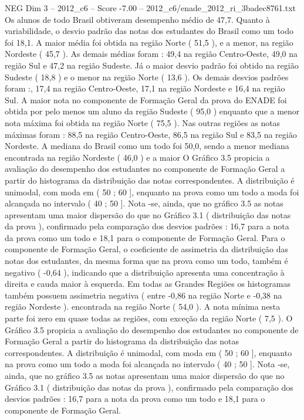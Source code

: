 \begin{textsample}{NEG Dim 3 – 2012\_c6 – Score -7.00 – 2012\_c6/enade\_2012\_ri\_3badec8761.txt}
Os alunos de todo Brasil obtiveram desempenho médio de 47,7.
Quanto à variabilidade, o desvio padrão das notas dos estudantes do Brasil como um todo foi 18,1.
A maior média foi obtida na região Norte ( 51,5 ), e a menor, na região Nordeste ( 45,7 ).
As demais médias foram : 49,4 na região Centro-Oeste, 49,0 na região Sul e 47,2 na região Sudeste.
Já o maior desvio padrão foi obtido na região Sudeste ( 18,8 ) e o menor na região Norte ( 13,6 ).
Os demais desvios padrões foram :, 17,4 na região Centro-Oeste, 17,1 na região Nordeste e 16,4 na região Sul.
A maior nota no componente de Formação Geral da prova do ENADE foi obtida por pelo menos um aluno da região Sudeste ( 95,0 ) enquanto que a menor nota máxima foi obtida na região Norte ( 75,5 ).
Nas outras regiões as notas máximas foram : 88,5 na região Centro-Oeste, 86,5 na região Sul e 83,5 na região Nordeste.
A mediana do Brasil como um todo foi 50,0, sendo a menor mediana encontrada na região Nordeste ( 46,0 ) e a maior O Gráfico 3.5 propicia a avaliação do desempenho dos estudantes no componente de Formação Geral a partir do histograma da distribuição das notas correspondentes.
A distribuição é unimodal, com moda em ( 50 ; 60 ], enquanto na prova como um todo a moda foi alcançada no intervalo ( 40 ; 50 ].
Nota -se, ainda, que no gráfico 3.5 as notas apresentam uma maior dispersão do que no Gráfico 3.1 ( distribuição das notas da prova ), confirmado pela comparação dos desvios padrões : 16,7 para a nota da prova como um todo e 18,1 para o componente de Formação Geral.
Para o componente de Formação Geral, o coeficiente de assimetria da distribuição das notas dos estudantes, da mesma forma que na prova como um todo, também é negativo ( -0,64 ), indicando que a distribuição apresenta uma concentração à direita e cauda maior à esquerda.
Em todas as Grandes Regiões os histogramas também possuem assimetria negativa ( entre -0,86 na região Norte e -0,38 na região Nordeste ). encontrada na região Norte ( 54,0 ).
A nota mínima nesta parte foi zero em quase todas as regiões, com exceção da região Norte ( 7,5 ).
O Gráfico 3.5 propicia a avaliação do desempenho dos estudantes no componente de Formação Geral a partir do histograma da distribuição das notas correspondentes.
A distribuição é unimodal, com moda em ( 50 ; 60 ], enquanto na prova como um todo a moda foi alcançada no intervalo ( 40 ; 50 ].
Nota -se, ainda, que no gráfico 3.5 as notas apresentam uma maior dispersão do que no Gráfico 3.1 ( distribuição das notas da prova ), confirmado pela comparação dos desvios padrões : 16,7 para a nota da prova como um todo e 18,1 para o componente de Formação Geral.

\end{textsample}
